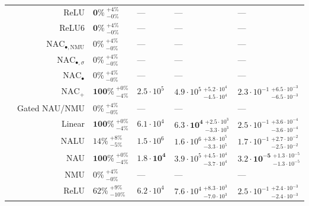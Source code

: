 \begin{longtable}{crllll}
\nopagebreak
 & ReLU & $\mathbf{0\%} {~}^{+4\%}_{-0\%}$ & --- & --- & ---\\

\nopagebreak
\multirow{-11}{*}{\centering\arraybackslash $\bm{\mathbin{/}}$} & ReLU6 & $\mathbf{0\%} {~}^{+4\%}_{-0\%}$ & --- & --- & ---\\
\cmidrule{1-6}
 & $\mathrm{NAC}_{\bullet,\mathrm{NMU}}$ & $0\% {~}^{+4\%}_{-0\%}$ & --- & --- & ---\\

\nopagebreak
 & $\mathrm{NAC}_{\bullet,\sigma}$ & $0\% {~}^{+4\%}_{-0\%}$ & --- & --- & ---\\

\nopagebreak
 & $\mathrm{NAC}_{\bullet}$ & $0\% {~}^{+4\%}_{-0\%}$ & --- & --- & ---\\

\nopagebreak
 & $\mathrm{NAC}_{+}$ & $\mathbf{100\%} {~}^{+0\%}_{-4\%}$ & $2.5 \cdot 10^{5}$ & $4.9 \cdot 10^{5} {~}^{+5.2 \cdot 10^{4}}_{-4.5 \cdot 10^{4}}$ & $2.3 \cdot 10^{-1} {~}^{+6.5 \cdot 10^{-3}}_{-6.5 \cdot 10^{-3}}$\\

\nopagebreak
 & Gated NAU/NMU & $0\% {~}^{+4\%}_{-0\%}$ & --- & --- & ---\\

\nopagebreak
 & Linear & $\mathbf{100\%} {~}^{+0\%}_{-4\%}$ & $6.1 \cdot 10^{4}$ & $\mathbf{6.3 \cdot 10^{4}} {~}^{+2.5 \cdot 10^{3}}_{-3.3 \cdot 10^{3}}$ & $2.5 \cdot 10^{-1} {~}^{+3.6 \cdot 10^{-4}}_{-3.6 \cdot 10^{-4}}$\\

\nopagebreak
 & NALU & $14\% {~}^{+8\%}_{-5\%}$ & $1.5 \cdot 10^{6}$ & $1.6 \cdot 10^{6} {~}^{+3.8 \cdot 10^{5}}_{-3.3 \cdot 10^{5}}$ & $1.7 \cdot 10^{-1} {~}^{+2.7 \cdot 10^{-2}}_{-2.5 \cdot 10^{-2}}$\\

\nopagebreak
 & NAU & $\mathbf{100\%} {~}^{+0\%}_{-4\%}$ & $\mathbf{1.8 \cdot 10^{4}}$ & $3.9 \cdot 10^{5} {~}^{+4.5 \cdot 10^{4}}_{-3.7 \cdot 10^{4}}$ & $\mathbf{3.2 \cdot 10^{-5}} {~}^{+1.3 \cdot 10^{-5}}_{-1.3 \cdot 10^{-5}}$\\

\nopagebreak
 & NMU & $0\% {~}^{+4\%}_{-0\%}$ & --- & --- & ---\\

\nopagebreak
 & ReLU & $62\% {~}^{+9\%}_{-10\%}$ & $6.2 \cdot 10^{4}$ & $7.6 \cdot 10^{4} {~}^{+8.3 \cdot 10^{3}}_{-7.0 \cdot 10^{3}}$ & $2.5 \cdot 10^{-1} {~}^{+2.4 \cdot 10^{-3}}_{-2.4 \cdot 10^{-3}}$\\


\end{longtable}
